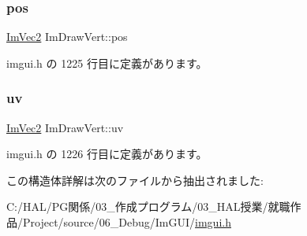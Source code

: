 \subsubsection{\texorpdfstring{pos}{pos}}
{\footnotesize\ttfamily \mbox{\hyperlink{struct_im_vec2}{Im\+Vec2}} Im\+Draw\+Vert\+::pos}



 imgui.\+h の 1225 行目に定義があります。

\mbox{\label{struct_im_draw_vert_abdf3183529055a6c3f709b23a4bf06b1}} 
\subsubsection{\texorpdfstring{uv}{uv}}
{\footnotesize\ttfamily \mbox{\hyperlink{struct_im_vec2}{Im\+Vec2}} Im\+Draw\+Vert\+::uv}



 imgui.\+h の 1226 行目に定義があります。



この構造体詳解は次のファイルから抽出されました\+:\begin{DoxyCompactItemize}
\item 
C\+:/\+H\+A\+L/\+P\+G関係/03\+\_\+作成プログラム/03\+\_\+\+H\+A\+L授業/就職作品/\+Project/source/06\+\_\+\+Debug/\+Im\+G\+U\+I/\mbox{\hyperlink{imgui_8h}{imgui.\+h}}\end{DoxyCompactItemize}
